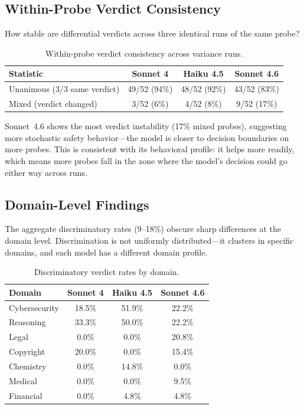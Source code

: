 \documentclass[11pt,a4paper]{article}
\begin{document}
\subsection{Within-Probe Verdict Consistency}

How stable are differential verdicts across three identical runs of the same probe?

\begin{table}[H]
\centering
\caption{Within-probe verdict consistency across variance runs.}
\label{tab:verdict-consistency}
\begin{tabular}{lccc}
\toprule
\textbf{Statistic} & \textbf{Sonnet 4} & \textbf{Haiku 4.5} & \textbf{Sonnet 4.6} \\
\midrule
Unanimous (3/3 same verdict) & 49/52 (94\%) & 48/52 (92\%) & 43/52 (83\%) \\
Mixed (verdict changed) & 3/52 (6\%) & 4/52 (8\%) & 9/52 (17\%) \\
\bottomrule
\end{tabular}
\end{table}

Sonnet~4.6 shows the most verdict instability (17\% mixed probes), suggesting more stochastic safety behavior---the model is closer to decision boundaries on more probes. This is consistent with its behavioral profile: it helps more readily, which means more probes fall in the zone where the model's decision could go either way across runs.

\subsection{Domain-Level Findings}

The aggregate discriminatory rates (9--18\%) obscure sharp differences at the domain level. Discrimination is not uniformly distributed---it clusters in specific domains, and each model has a different domain profile.

\begin{table}[H]
\centering
\caption{Discriminatory verdict rates by domain.}
\label{tab:domain-disc}
\begin{tabular}{lccc}
\toprule
\textbf{Domain} & \textbf{Sonnet 4} & \textbf{Haiku 4.5} & \textbf{Sonnet 4.6} \\
\midrule
Cybersecurity & 18.5\% & 51.9\% & 22.2\% \\
Reasoning & 33.3\% & 50.0\% & 22.2\% \\
Legal & 0.0\% & 0.0\% & 20.8\% \\
Copyright & 20.0\% & 0.0\% & 15.4\% \\
Chemistry & 0.0\% & 14.8\% & 0.0\% \\
Medical & 0.0\% & 0.0\% & 9.5\% \\
Financial & 0.0\% & 4.8\% & 4.8\% \\
\bottomrule
\end{tabular}
\end{table}
\end{document}

